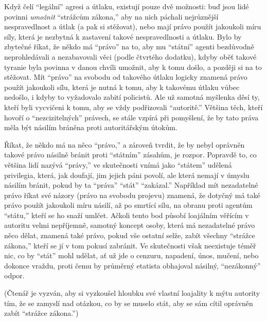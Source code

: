 \documentclass{book}
\begin{document}
Když čelí \enquote{legální} agresi a útlaku, existují pouze dvě možnosti: buď jsou lidé povinni \emph{umožnit} \enquote{strážcům zákona,} aby na nich páchali nejrůznější nespravedlnost a útlak (a pak si stěžovat), nebo mají právo použít jakoukoli míru síly, která je nezbytná k zastavení takové nespravedlnosti a útlaku. Bylo by zbytečné říkat, že někdo má \enquote{právo} na to, aby mu \enquote{státní} agenti bezdůvodně neprohledávali a nezabavovali věci (podle čtvrtého dodatku), kdyby oběť takové tyranie byla povinna v danou chvíli umožnit, aby k tomu došlo, a později si na to stěžovat. Mít \enquote{právo} na svobodu od takového útlaku logicky znamená právo použít jakoukoli sílu, která je nutná k tomu, aby k takovému útlaku vůbec nedošlo, i kdyby to vyžadovalo zabití policistů. Ale už samotná myšlenka děsí ty, kteří byli vycvičeni k tomu, aby se vždy podřizovali \enquote{autoritě.} Většina těch, kteří hovoří o \enquote{nezcizitelných} právech, se stále vzpírá při pomyšlení, že by tato práva měla být násilím bráněna proti autoritářským útokům.

Říkat, že někdo má na něco \enquote{právo,} a zároveň tvrdit, že by nebyl oprávněn takové právo násilně bránit proti \enquote{státním} zásahům, je rozpor. Popravdě to, co většina lidí nazývá \enquote{právy,} ve skutečnosti vnímá jako \enquote{státem} udělená privilegia, která, jak doufají, jim jejich páni povolí, ale která nemají v úmyslu násilím bránit, pokud by ta \enquote{práva} \enquote{stát} \enquote{zakázal.} Například mít nezadatelné právo říkat své názory (právo na svobodu projevu) znamená, že dotyčný má také právo použít jakoukoli míru násilí, až po smrtící sílu, na obranu proti agentům \enquote{státu,} kteří se ho snaží umlčet. Ačkoli tento bod působí loajálním věřícím v autoritu velmi nepříjemně, samotný koncept osoby, která má nezadatelné právo něco dělat, znamená také právo, pokud vše ostatní selže, zabít všechny \enquote{strážce zákona,} kteří se jí v tom pokusí zabránit. Ve skutečnosti však neexistuje téměř nic, co by \enquote{stát} mohl udělat, ať už jde o cenzuru, napadení, únos, mučení, nebo dokonce vraždu, proti čemu by průměrný etatista obhajoval násilný, \enquote{nezákonný} odpor.

(Čtenář je vyzván, aby si vyzkoušel hloubku své vlastní loajality k mýtu autority tím, že se zamyslí nad otázkou, co by se muselo stát, aby se sám cítil oprávněn zabít \enquote{strážce zákona.})
\end{document}

